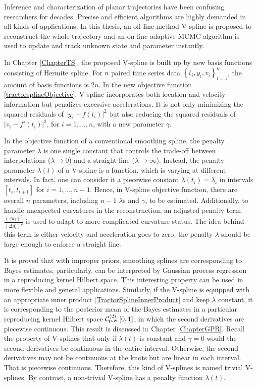 
Inference and characterization of planar trajectories have been confusing researchers for decades. Precise and efficient algorithms are highly demanded in all kinds of applications. In this thesis, an off-line method V-spline is proposed to reconstruct the whole trajectory and an on-line adaptive MCMC algorithm is used to update and track unknown state and parameter instantly. 

In Chapter \ref{ChapterTS}, the proposed V-spline is built up by new basis functions consisting of Hermite spline. For $n$ paired time series data $\left\lbrace t_i,y_i,v_i\right\rbrace_{i=1}^{n}$, the amount of basis functions is $2n$. In the new objective function \eqref{tractorsplineObjective}, V-spline incorporates both location and velocity information but penalizes excessive accelerations. It is not only minimizing the squared residuals of $\lvert y_i-f(t_i)\rvert^2$ but also reducing the squared residuals of $\lvert v_i-f'(t_i)\rvert^2$, for $i=1,\ldots,n$, with a new parameter $\gamma$. 

In the objective function of a conventional smoothing spline, the penalty parameter $\lambda$ is one single constant that controls the trade-off between interpolations ($\lambda\to 0$) and a straight line ($\lambda\to \infty$). Instead, the penalty parameter $\lambda(t)$ of a V-spline is a function, which is varying at different intervals. In fact, one can consider it a piecewise constant $\lambda(t_i)=\lambda_i$ in intervals $[t_i,t_{i+1}]$ for $i=1,\ldots,n-1$. Hence, in V-spline objective function, there are overall $n$ parameters, including $n-1$ $\lambda$s and $\gamma$, to be estimated. Additionally, to handle unexpected curvatures in the reconstruction, an adjusted penalty term $\frac{(\Delta t_i)^3}{(\Delta d_i)^2}$ is used to adapt to more complicated curvature status. The idea behind this term is either velocity and acceleration goes to zero, the penalty $\lambda$ should be large enough to enforce a straight line. 

It is proved that with improper priors, smoothing splines are corresponding to Bayes estimates, particularly, can be interpreted by Gaussian process regression in a reproducing kernel Hilbert space. This interesting property can be used in more flexible and general applications. Similarly, if the V-spline is equipped with an appropriate inner product \eqref{TractorSplineInnerProduct} and keep $\lambda$ constant, it is corresponding to the posterior mean of the Bayes estimates in a particular reproducing kernel Hilbert space $\mathcal{C}_{\mbox{\scriptsize p.w.}}^{(2)}[0,1]$, in which the second derivatives are piecewise continuous. This result is discussed in Chapter \ref{ChapterGPR}. Recall the property of V-splines that only if $\lambda(t)$ is constant and $\gamma=0$ would the second derivatives be continuous in the entire interval. Otherwise, the second derivatives may not be continuous at the knots but are linear in each interval. That is piecewise continuous. Therefore, this kind of V-splines is named trivial V-splines. By contrast, a non-trivial V-spline has a penalty function $\lambda(t)$. 

